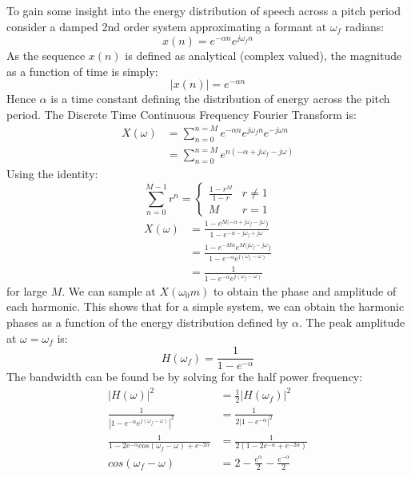 \documentclass{article}
\begin{document}
To gain some insight into the energy distribution of speech across a pitch period consider a damped 2nd order system approximating a formant at $\omega_f$ radians:
\begin{equation}
x(n) = e^{-\alpha n}e^{j \omega_f n}
\end{equation}
As the sequence $x(n)$ is defined as analytical (complex valued), the magnitude as a function of time is simply:
\begin{equation}
|x(n)| = e^{-\alpha n}
\end{equation}
Hence $\alpha$ is a time constant defining the distribution of energy across the pitch period.  The Discrete Time Continuous Frequency Fourier Transform is:
\begin{equation}
\begin{split}
X(\omega) &= \sum_{n=0}^{n=M} e^{-\alpha n}e^{j \omega_f n}e^{-j \omega n} \\
           &= \sum_{n=0}^{n=M} e^{n(-\alpha + j \omega_f - j \omega)}
\end{split}
\end{equation}
Using the identity:
\begin{equation}
\label{eq:geo_sum}
\sum_{n=0}^{M-1} r^n = 
\begin{cases}
  \frac{1-r^M}{1-r} & r \ne 1 \\
   M                & r = 1 
\end{cases}   
\end{equation}
\begin{equation}
\begin{split}
X(\omega) &= \frac{1 - e^{M(-\alpha + j \omega_f - j \omega})}{1 - e^{-\alpha - j \omega_f + j \omega}} \\
          &= \frac{1 - e^{-M \alpha}e^{M( j \omega_f - j \omega})}{1 - e^{-\alpha}e^{ j( \omega_f - \omega)}} \\
           &= \frac{1}{1 - e^{-\alpha}e^{j (\omega_f - \omega)}}
\end{split}
\end{equation}
for large $M$.  We can sample at $X(\omega_0 m)$ to obtain the phase and amplitude of each harmonic. This shows that for a simple system, we can obtain the harmonic phases as a function of the energy distribution defined by $\alpha$.  The peak amplitude at $\omega=\omega_f$ is:
\begin{equation}
H(\omega_f) = \frac{1}{1-e^{-\alpha}}	
\end{equation}
The bandwidth can be found be by solving for the half power frequency:
\begin{equation}
\begin{split}
|H(\omega)|^2 &= \frac{1}{2}|H(\omega_f)|^2 \\
\frac{1}{|1 - e^{-\alpha}e^{j (\omega_f - \omega)}|^2} &= \frac{1}{2|1-e^{-\alpha}|^2} \\
\frac{1}{1 - 2e^{-\alpha}cos(\omega_f - \omega) + e^{-2\alpha}} &= \frac{1}{2(1-2e^{-\alpha} + e^{-2 \alpha})} \\
cos(\omega_f - \omega) &= 2 - \frac{e^{\alpha}}{2} - \frac{e^{-\alpha}}{2}
\end{split}
\end{equation}
\end{document}
